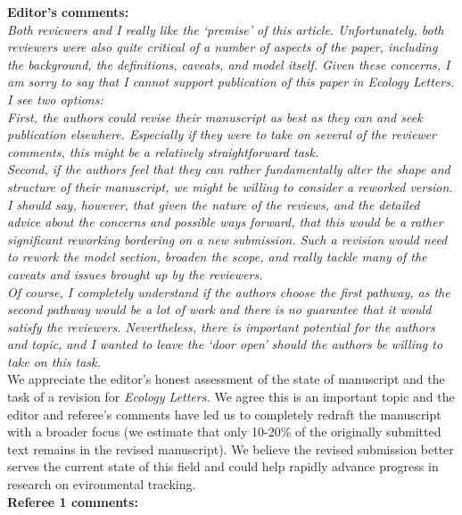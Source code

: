 \documentclass[11pt]{article}
\begin{document}
{\bf Editor's comments:} \\

\emph{Both reviewers and I really like the `premise' of this article.  Unfortunately, both
reviewers were also quite critical of a number of aspects of the paper, including the
background, the definitions, caveats, and model itself.  Given these concerns, I am sorry to
say that I cannot support publication of this paper in Ecology Letters.  I see two options:}\\ 

\emph{First, the authors could revise their manuscript as best as they can and seek publication
elsewhere. Especially if they were to take on several of the reviewer comments, this might be
a relatively straightforward task.}\\

\emph{Second, if the authors feel that they can rather fundamentally alter the shape and structure
of their manuscript, we might be willing to consider a reworked version. I should say,
however, that given the nature of the reviews, and the detailed advice about the concerns and
possible ways forward, that this would be a rather significant reworking bordering on a new
submission. Such a revision would need to rework the model section, broaden the scope, and
really tackle many of the caveats and issues brought up by the reviewers.}\\

\emph{Of course, I completely understand if the authors choose the first pathway, as the second
pathway would be a lot of work and there is no guarantee that it would satisfy the reviewers.
Nevertheless, there is important potential for the authors and topic, and I wanted to leave
the `door open' should the authors be willing to take on this task.}\\

We appreciate the editor's honest assessment of the state of manuscript and the task of a revision for \emph{Ecology Letters.} We agree this is an important topic and the editor and referee's comments have led us to completely redraft the manuscript with a broader focus (we estimate that only 10-20\% of the originally submitted text remains in the revised manuscript). We believe the revised submission better serves the current state of this field and could help rapidly advance progress in research on evironmental tracking.\\

{\bf Referee 1 comments:} \\
\end{document}
